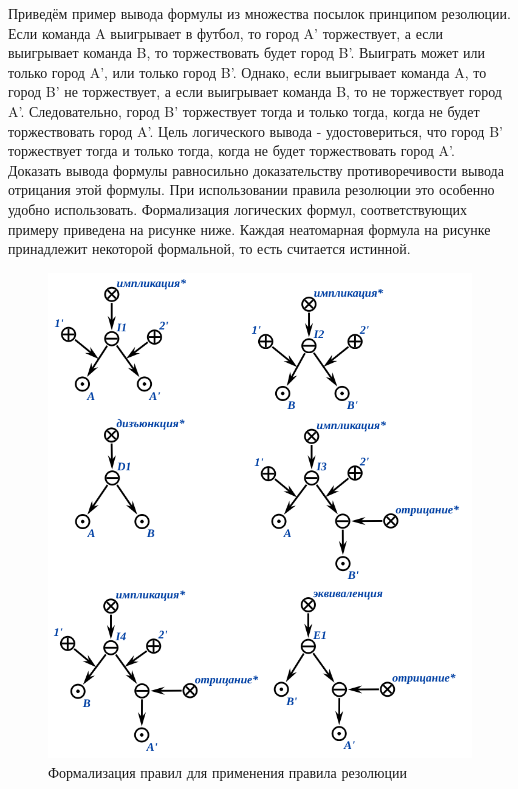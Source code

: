 Приведём пример вывода формулы из множества посылок принципом резолюции.
Если команда A выигрывает в футбол, то город A' торжествует, а если выигрывает команда B, то торжествовать будет город B'. Выиграть может или только город A', или только город B'. Однако, если выигрывает команда A, то город B' не торжествует, а если выигрывает команда B, то не торжествует город A'. Следовательно, город B' торжествует тогда и только тогда, когда не будет торжествовать город A'. Цель логического вывода - удостовериться, что город B' торжествует тогда и только тогда, когда не будет торжествовать город A'. Доказать вывода формулы равносильно доказательству противоречивости вывода отрицания этой формулы. При использовании правила резолюции это особенно удобно использовать.
Формализация логических формул, соответствующих примеру приведена на рисунке ниже. Каждая неатомарная формула на рисунке принадлежит некоторой формальной, то есть считается истинной.

\begin{figure}[H]
	\includegraphics[scale=0.8]{author/part3/figures/resolution_formulas_example.png}
	\caption{Формализация правил для применения правила резолюции}
	\label{fig:resolution_formulas}
\end{figure}


